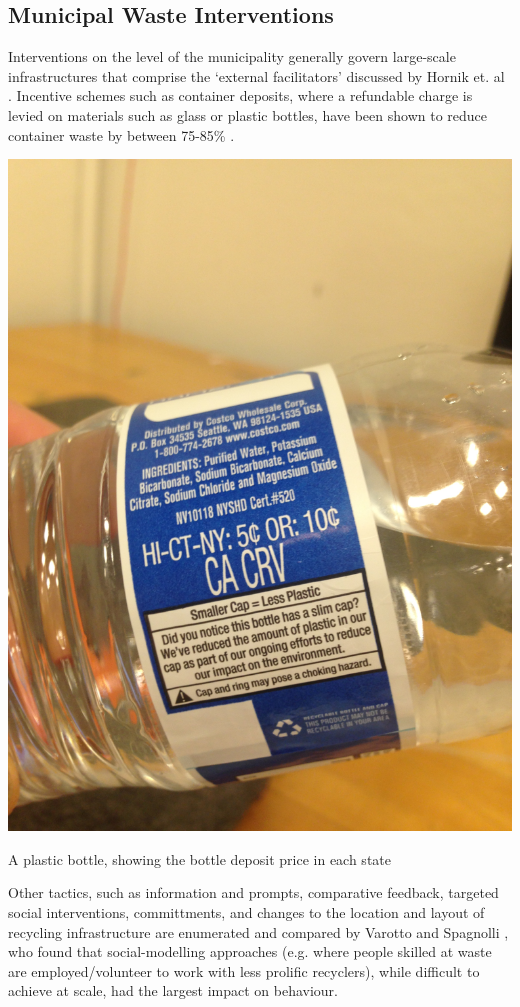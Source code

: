 \documentclass[nofonts,nols,justified,nobib]{tufte-book}
\begin{document}
\subsection*{Municipal Waste Interventions}
Interventions on the level of the municipality generally govern large-scale infrastructures that comprise the `external facilitators' discussed by Hornik et. al \cite{hornik_determinants_1995}. Incentive schemes such as container deposits, where a refundable charge is levied on materials such as glass or plastic bottles, have been shown to reduce container waste by between 75-85\% \cite{hong_economic_1993}. 
\begin{marginfigure}
\includegraphics[width=\textwidth]{img/1/bottle-deposit.JPG}
\caption{A plastic bottle, showing the bottle deposit price in each state}
\end{marginfigure}
Other tactics, such as information and prompts, comparative feedback, targeted social interventions, committments, and changes to the location and layout of recycling infrastructure are enumerated and compared by Varotto and Spagnolli \cite{varotto_psychological_2017}, who found that social-modelling approaches (e.g. where people skilled at waste are employed/volunteer to work with less prolific recyclers), while difficult to achieve at scale, had the largest impact on behaviour. 
\end{document}
